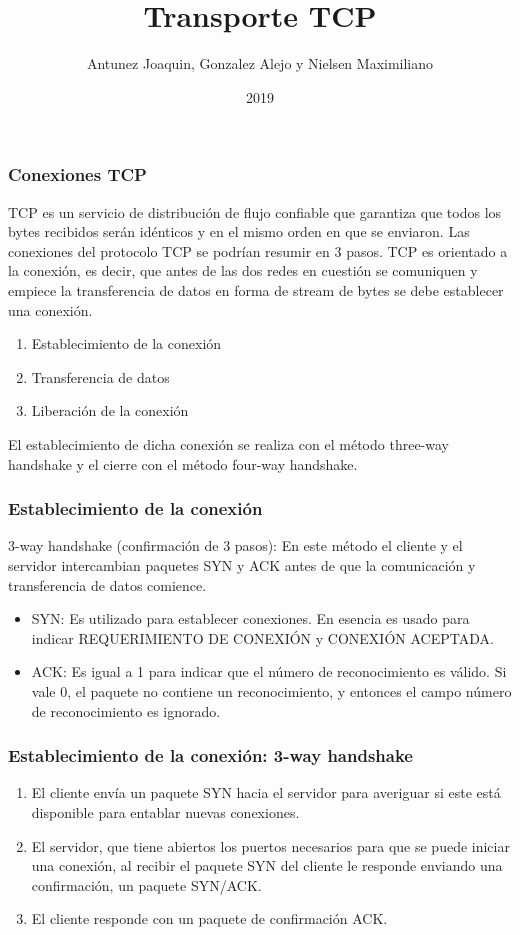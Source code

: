 \documentclass{beamer}
\title{Transporte TCP}
\author{Antunez Joaquin, Gonzalez Alejo y Nielsen Maximiliano}
\institute{Instituto Politécnico Superior Gral. San Martín}
\date{2019}
\begin{document}
 
\frame{\titlepage}
 
\begin{frame}
\frametitle{Conexiones TCP}
TCP es un servicio de distribución de flujo confiable que garantiza que todos los bytes recibidos serán idénticos y en el mismo orden en que se enviaron.
Las conexiones del protocolo TCP se podrían resumir en 3 pasos.
TCP es orientado a la conexión, es decir, que antes de las dos redes en cuestión se comuniquen y empiece la transferencia de datos en forma de stream de bytes se debe establecer una conexión.
\vspace{5mm}
\begin{enumerate}
\item Establecimiento de la conexión
\item Transferencia de datos
\item Liberación de la conexión
\end{enumerate}

\vspace{5mm}

El establecimiento de dicha conexión se realiza con el método three-way handshake y el cierre con el método four-way handshake.

\end{frame}

\begin{frame}
\frametitle{Establecimiento de la conexión}
3-way handshake (confirmación de 3 pasos): En este método el cliente y el servidor intercambian paquetes SYN y ACK antes de que la comunicación y transferencia de datos comience.
\vspace{5mm}
\begin{itemize}
\item SYN: Es utilizado para establecer conexiones. En esencia es usado para indicar REQUERIMIENTO DE CONEXIÓN y CONEXIÓN ACEPTADA.
\item ACK: Es igual a 1 para indicar que el número de reconocimiento es válido. Si vale 0, el paquete no contiene un reconocimiento, y entonces el campo número de reconocimiento es ignorado.
\end{itemize}
\end{frame}

\begin{frame}
\frametitle{Establecimiento de la conexión: 3-way handshake}
\begin{enumerate}
\item El cliente envía un paquete SYN hacia el servidor para averiguar si este está disponible para entablar nuevas conexiones.
\item El servidor, que tiene abiertos los puertos necesarios para que se puede iniciar una conexión, al recibir el paquete SYN del cliente le responde enviando una confirmación, un paquete SYN/ACK.
\item El cliente responde con un paquete de confirmación ACK.
\end{enumerate}
\end{frame}
\end{document}
